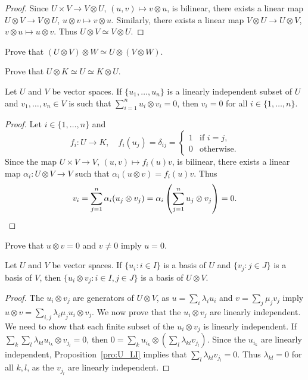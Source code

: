 \begin{proof}
	Since $U\times V\to V\otimes U$, $(u,v)\mapsto v\otimes u$, is bilinear, there exists 
	a linear map $U\otimes V\to V\otimes U$, $u\otimes
	v\mapsto v\otimes u$. Similarly, there exists a linear map 
	$V\otimes U\to U\otimes V$, $v\otimes u\mapsto
	u\otimes v$. Thus $U\otimes V\simeq V\otimes U$.
\end{proof}

\begin{exercise}
	\label{xca:UxVxW}
    Prove that $(U\otimes V)\otimes W\simeq U\otimes(V\otimes W)$.
\end{exercise}

\begin{exercise}
	\label{xca:UxK}
	Prove that $U\otimes K\simeq U\simeq K\otimes U$.
\end{exercise}

\begin{proposition}
	\label{pro:U_LI}
	Let $U$ and $V$ be vector spaces. 
	If $\{u_1,\dots,u_n\}$ is a linearly independent subset of $U$ and 
	$v_1,\dots,v_n\in V$ is such that $\sum_{i=1}^n u_i\otimes v_i=0$, then 
    $v_i=0$ for all $i\in\{1,\dots,n\}$.
\end{proposition}

\begin{proof}
	Let $i\in\{1,\dots,n\}$ and 
	\[
	f_i\colon U\to K,
	\quad
	f_i(u_j)=\delta_{ij}=\begin{cases}
	1 & \text{if $i=j$},\\
	0 & \text{otherwise}.
	\end{cases}
	\]
	Since the map $U\times V\to V$, $(u,v)\mapsto f_i(u)v$, is bilinear, there exists 
	a linear map 
	$\alpha_i\colon U\otimes V\to V$ such that $\alpha_i(u\otimes
	v)=f_i(u)v$. Thus
	\[
		v_i=\sum_{j=1}^n\alpha_i(u_j\otimes v_j)=\alpha_i\left(\sum_{j=1}^nu_j\otimes v_j\right)=0.\qedhere
	\]
\end{proof}

\begin{exercise}
	\label{xca:uxv=0}
	Prove that $u\otimes v=0$ and $v\ne 0$ imply $u=0$.
\end{exercise}

\begin{theorem}
    Let $U$ and $V$ be vector spaces. 
	If $\{u_i:i\in I\}$ is a basis of $U$ and $\{v_j:j\in J\}$ is a basis of $V$, then 
	$\{u_i\otimes v_j:i\in I,j\in J\}$ is a basis of $U\otimes
	V$.
\end{theorem}

\begin{proof}
	The $u_i\otimes v_j$ are generators of $U\otimes V$, as  
    $u=\sum_i\lambda_iu_i$ and $v=\sum_j\mu_jv_j$ imply 
	$u\otimes v=\sum_{i,j}\lambda_i\mu_ju_i\otimes v_j$. 
	We now prove that the $u_i\otimes v_j$ are linearly independent. We need to show that
	each finite subset of the $u_i\otimes v_j$
	is linearly independent. If $\sum_k\sum_l\lambda_{kl}u_{i_k}\otimes
	v_{j_l}=0$, then 
	$0=\sum_{k}u_{i_k}\otimes\left(\sum_{l}\lambda_{kl}v_{j_l}\right)$. Since  
	the $u_{i_k}$ are linearly independent, Proposition~\ref{pro:U_LI}
	implies that $\sum_{l}\lambda_{kl}v_{j_l}=0$. Thus $\lambda_{kl}=0$ for all 
	$k,l$, as the $v_{j_l}$ are linearly independent. 
\end{proof}

